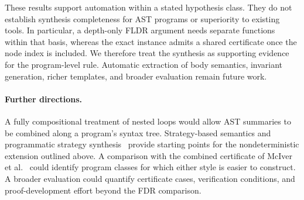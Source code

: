 These results support automation within a stated hypothesis class. They do
not establish synthesis completeness for AST programs or superiority to
existing tools. In particular, a depth-only FLDR argument needs separate
functions within that basis, whereas the exact instance admits a shared
certificate once the node index is included. We therefore treat the synthesis
as supporting evidence for the program-level rule. Automatic extraction of
body semantics, invariant generation, richer templates, and broader evaluation
remain future work.

\paragraph{Further directions.}
A fully compositional treatment of nested loops would allow AST summaries to be combined along a program's syntax tree. Strategy-based semantics and programmatic strategy synthesis~\cite{DBLP:journals/pacmpl/BatzBKW24} provide starting points for the nondeterministic extension outlined above. A comparison with the combined certificate of McIver et al.~\cite{10.1145/3158121} could identify program classes for which either style is easier to construct. A broader evaluation could quantify certificate cases, verification conditions, and proof-development effort beyond the FDR comparison.
